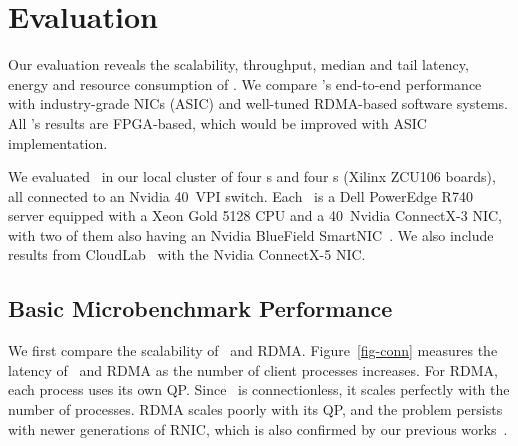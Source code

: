 



\section{Evaluation}
\label{sec:clio:results}


Our evaluation reveals the scalability, throughput, median and tail latency, energy and resource consumption of \sys.
We compare \sys's end-to-end performance with industry-grade NICs (ASIC) and well-tuned RDMA-based software systems.
All \sys's results are FPGA-based, which would be improved with ASIC implementation.

We evaluated \sys\ in our local cluster of four \CN{}s and four \MN{}s (Xilinx ZCU106 boards),
all connected to an Nvidia 40\Gbps\ VPI switch.
Each \CN\ is a Dell PowerEdge R740 server equipped with a Xeon Gold 5128 CPU and a 40\Gbps\ Nvidia ConnectX-3 NIC,
with two of them also having an Nvidia BlueField SmartNIC~\cite{BlueField}.
We also include results from CloudLab~\cite{CloudLab} with the Nvidia ConnectX-5 NIC.


\subsection{Basic Microbenchmark Performance}





We first compare the scalability of \sys\ and RDMA.
Figure~\ref{fig-conn} measures the latency of \sys\ and RDMA as the number of client processes increases.
For RDMA, each process uses its own QP.
Since \sys\ is connectionless, it scales perfectly with the number of processes.
RDMA scales poorly with its QP, and the problem persists with newer generations of RNIC,
which is also confirmed by our previous works~\cite{Pythia,Storm}.

